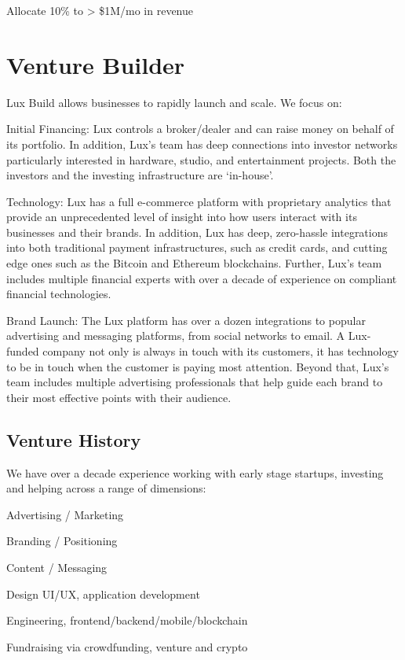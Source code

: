 \documentclass[11pt]{article}
\begin{document}
Allocate 10\% to > \$1M/mo in revenue


\section{Venture Builder}

Lux Build allows businesses to rapidly launch and scale. We focus on:


Initial Financing: Lux controls a broker/dealer and can raise money on behalf of its portfolio. In addition, Lux's team has deep connections into investor networks particularly interested in hardware, studio, and entertainment projects. Both the investors and the investing infrastructure are `in-house'.


Technology: Lux has a full e-commerce platform with proprietary analytics that provide an unprecedented level of insight into how users interact with its businesses and their brands. In addition, Lux has deep, zero-hassle integrations into both traditional payment infrastructures, such as credit cards, and cutting edge ones such as the Bitcoin and Ethereum blockchains. Further, Lux's team includes multiple financial experts with over a decade of experience on compliant financial technologies.


Brand Launch: The Lux platform has over a dozen integrations to popular advertising and messaging platforms, from social networks to email. A Lux-funded company not only is always in touch with its customers, it has technology to be in touch when the customer is paying most attention. Beyond that, Lux's team includes multiple advertising professionals that help guide each brand to their most effective points with their audience.


\subsection{Venture History}

We have over a decade experience working with early stage startups, investing and helping across a range of dimensions:


Advertising / Marketing


Branding / Positioning


Content / Messaging


Design UI/UX, application development


Engineering, frontend/backend/mobile/blockchain


Fundraising via crowdfunding, venture and crypto
\end{document}
